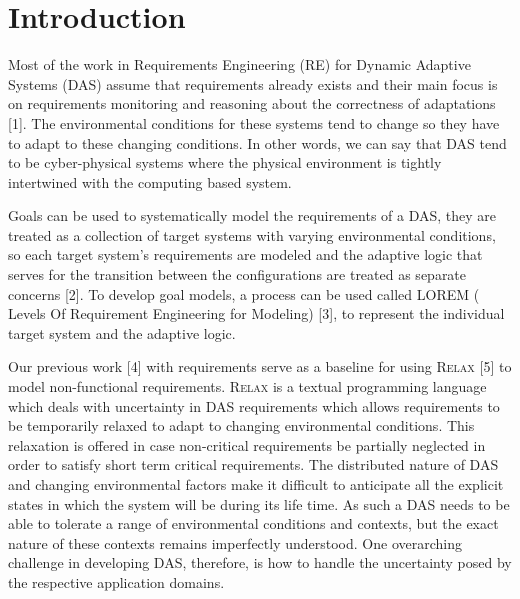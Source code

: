 \documentclass[10pt, conference, compsocconf]{IEEEtran}
\def\myrelax{\textsc{Relax}}                  %
\begin{document}
%
\IEEEpeerreviewmaketitle


\section{Introduction}

Most of the work in Requirements Engineering (RE) for Dynamic Adaptive Systems (DAS) assume that requirements already exists and their main focus is on requirements monitoring and reasoning about the correctness of adaptations [1]. The environmental conditions for these systems tend to change so they have to adapt to these changing conditions.  In other words, we can say that DAS tend to be cyber-physical systems where the physical environment is tightly intertwined with the computing based system. 

Goals can be used to systematically model the requirements of a DAS, they are treated as a collection of target systems with varying environmental conditions, so each target system's requirements are modeled and the adaptive logic that serves for the transition between the configurations are treated as separate concerns [2]. To develop goal models, a process can be used called LOREM ( Levels Of Requirement Engineering for Modeling) [3], to represent the individual target system and the adaptive logic. 

Our previous work [4] with requirements serve as a baseline for using \myrelax{} [5] to model non-functional requirements. \myrelax{} is a textual programming language which deals with uncertainty in DAS requirements which allows requirements to be temporarily relaxed to adapt to changing environmental conditions. This relaxation is offered in case non-critical requirements be partially neglected in order to satisfy short term critical requirements. The distributed nature of DAS and changing environmental factors make it difficult to anticipate all the explicit states in which the system will be during its life time. As such a DAS needs to be able to tolerate a range of environmental conditions and contexts, but the exact nature of these contexts remains imperfectly understood. One overarching challenge in developing DAS, therefore, is how to handle the uncertainty posed by the respective application domains. 
\end{document}
